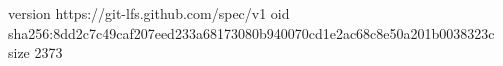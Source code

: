 version https://git-lfs.github.com/spec/v1
oid sha256:8dd2c7c49caf207eed233a68173080b940070cd1e2ac68c8e50a201b0038323c
size 2373
